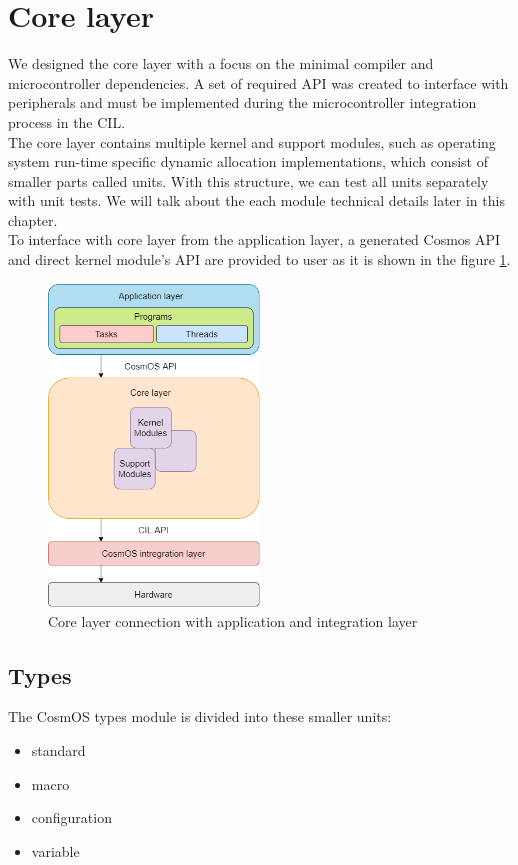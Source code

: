 \section{Core layer}
We designed the core layer with a focus on the minimal compiler and microcontroller dependencies. A set of required \ac{API} was created to interface with peripherals and must be implemented during the microcontroller integration process in the \ac{CIL}. \\
\indent The core layer contains multiple kernel and support modules, such as operating system run-time specific dynamic allocation implementations, which consist of smaller parts called units. With this structure, we can test all units separately with unit tests. We will talk about the each module technical details later in this chapter.\\
\indent To interface with core layer from the application layer, a generated Cosmos \ac{API} and direct kernel module's \ac{API} are provided to user as it is shown in the figure \ref{fig:coreLayer}.

\begin{figure}[H]
\begin{center}
\includegraphics[width=0.5\textwidth]{images/cosmos_structure.png}
\caption{Core layer connection with application and integration layer}
\label{fig:coreLayer}
\end{center}
\end{figure}

\subsection{Types}
The CosmOS types module is divided into these smaller units:
\begin{itemize}
\vspace{-0.2cm}\item standard
\vspace{-0.2cm}\item macro
\vspace{-0.2cm}\item configuration
\vspace{-0.2cm}\item variable
\end{itemize}

